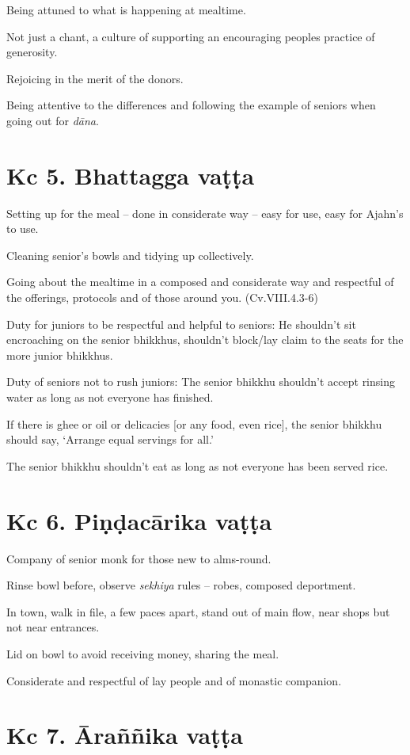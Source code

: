 Being attuned to what is happening at mealtime.

Not just a chant, a culture of supporting an encouraging peoples
practice of generosity.

Rejoicing in the merit of the donors.

Being attentive to the differences and following the example of seniors
when going out for \emph{dāna}.

\section{Kc 5. Bhattagga vaṭṭa}

Setting up for the meal -- done in considerate way -- easy for use, easy
for Ajahn's to use.

Cleaning senior's bowls and tidying up collectively.

Going about the mealtime in a composed and considerate way and
respectful of the offerings, protocols and of those around you.
(Cv.VIII.4.3-6)

Duty for juniors to be respectful and helpful to seniors: He shouldn't
sit encroaching on the senior bhikkhus, shouldn't block/lay claim to the
seats for the more junior bhikkhus.

Duty of seniors not to rush juniors: The senior bhikkhu shouldn't accept
rinsing water as long as not everyone has finished.

If there is ghee or oil or delicacies {[}or any food, even rice{]}, the
senior bhikkhu should say, `Arrange equal servings for all.'

The senior bhikkhu shouldn't eat as long as not everyone has been served
rice.

\section{Kc 6. Piṇḍacārika vaṭṭa}

Company of senior monk for those new to alms-round.

Rinse bowl before, observe \emph{sekhiya} rules -- robes, composed
deportment.

In town, walk in file, a few paces apart, stand out of main flow, near
shops but not near entrances.

Lid on bowl to avoid receiving money, sharing the meal.

Considerate and respectful of lay people and of monastic companion.

\section{Kc 7. Āraññika vaṭṭa}

